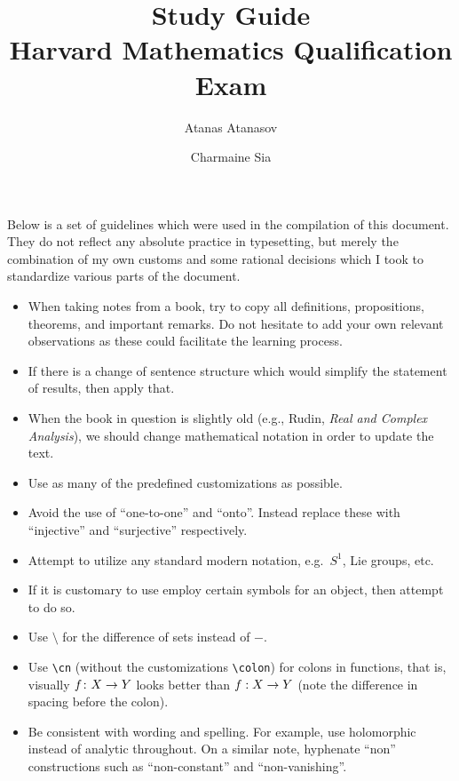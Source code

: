 \documentclass[10pt]{amsbook}
\begin{document}
\title[Study Guide, Harvard Mathematics Qualification Exam]{Study Guide \\ Harvard Mathematics Qualification Exam}
\author[A. Atanasov]{Atanas Atanasov}
\author[C. Sia]{Charmaine Sia}
\date{}

\maketitle

\setcounter{tocdepth}{2}
\tableofcontents

Below is a set of guidelines which were used in the compilation of this document. They do not reflect any absolute practice in typesetting, but merely the combination of my own customs and some rational decisions which I took to standardize various parts of the document.
\begin{itemize}
\item When taking notes from a book, try to copy all definitions, propositions, theorems, and important remarks. Do not hesitate to add your own relevant observations as these could facilitate the learning process.
\item If there is a change of sentence structure which would simplify the statement of results, then apply that.
\item When the book in question is slightly old (e.g., Rudin, \emph{Real and Complex Analysis}), we should change mathematical notation in order to update the text.
\item Use as many of the predefined customizations as possible.
\item Avoid the use of ``one-to-one'' and ``onto''. Instead replace these with ``injective'' and ``surjective'' respectively.
\item Attempt to utilize any standard modern notation, e.g.\ $S^1$, Lie groups, etc.
\item If it is customary to use employ certain symbols for an object, then attempt to do so.
\item Use $\setminus$ for the difference of sets instead of $-$.
\item Use \texttt{\textbackslash cn} (without the customizations \texttt{\textbackslash colon}) for colons in functions, that is, visually $f \colon X \rightarrow Y$ looks better than $f : X \rightarrow Y$ (note the difference in spacing before the colon).
\item Be consistent with wording and spelling. For example, use holomorphic instead of analytic throughout. On a similar note, hyphenate ``non'' constructions such as ``non-constant'' and ``non-vanishing''.
\end{itemize}
\vspace{\baselineskip}
\end{document}
